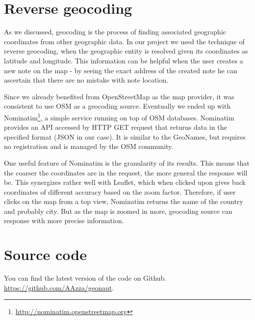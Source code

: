 \documentclass[12pt,a4paper]{article}
\begin{document}
\section{Reverse geocoding}

As we discussed, geocoding is the process of finding associated geographic coordinates
from other geographic data. In our project we used the technique of
reverse geocoding, when the geographic entity is resolved given its
coordinates as latitude and longitude. This information can be helpful
when the user creates a new note on the map - by seeing the exact
address of the created note he can ascertain that there are no mistake
with note location.

Since we already benefited from OpenStreetMap as the map provider, it was
consistent to use OSM as a geocoding source. Eventually we ended up
with Nominatim\footnote{\url{http://nominatim.openstreetmap.org}}, a simple
service running on top of OSM databases. Nominatim provides an API
accessed by HTTP GET request that returns data in the specified format
(JSON in our case). It is similar to the GeoNames, but requires no registration
and is managed by the OSM community.

One useful feature of Nominatim is the granularity of its results.
This means that the coarser the coordinates are in the request, the
more general the response will be. This synergizes rather well with
Leaflet, which when clicked upon gives back coordinates of different
accuracy based on the zoom factor. Therefore, if user clicks on the
map from a top view, Nominatim returns the name of the country and
probably city. But as the map is zoomed in more, geocoding source can
response with more precise information.

\section{Source code}
    You can find the latest version of the code on Github.
    \url{https://github.com/AAzza/geonaut}.
\end{document}

